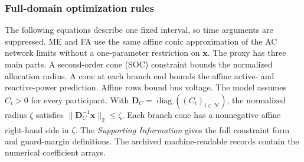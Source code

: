 \documentclass[twoside,twocolumn,9pt]{article}
\newcommand{\suppref}{\textit{Supporting Information}\textsuperscript{\dag}}
\begin{document}
{\subsubsection{Full-domain optimization rules}

The following equations describe one fixed interval, so time arguments are
suppressed. ME and FA use the same affine conic approximation of the AC network
limits without a one-parameter restriction on $\mathbf x$. The proxy has three
main parts. A
second-order cone (SOC) constraint bounds the normalized allocation radius. A
cone at each branch end bounds the affine active- and reactive-power prediction.
Affine rows bound bus voltage. The model assumes $C_i>0$ for every participant.
With $\mathbf D_C=\operatorname{diag}((C_i)_{i\in\mathcal N})$, the normalized
radius $\zeta$ satisfies $\|\mathbf D_C^{-1}\mathbf x\|_2\le\zeta$. Each branch
cone has a nonnegative affine right-hand side in $\zeta$. The \suppref{} gives
the full constraint form and guard-margin definitions. The archived
machine-readable records contain the numerical coefficient arrays.

}
\end{document}

